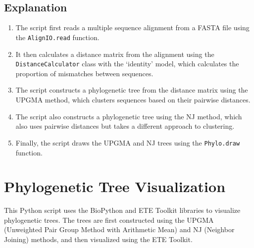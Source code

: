 \documentclass[11pt]{article}
\begin{document}
    \begin{center}
    \end{center}
    { \hspace*{\fill} \\}
    
    \begin{center}
    \end{center}
    { \hspace*{\fill} \\}
    
    \subsection{Explanation}\label{explanation}

\begin{enumerate}
\def\labelenumi{\arabic{enumi}.}
\item
  The script first reads a multiple sequence alignment from a FASTA file
  using the \texttt{AlignIO.read} function.
\item
  It then calculates a distance matrix from the alignment using the
  \texttt{DistanceCalculator} class with the `identity' model, which
  calculates the proportion of mismatches between sequences.
\item
  The script constructs a phylogenetic tree from the distance matrix
  using the UPGMA method, which clusters sequences based on their
  pairwise distances.
\item
  The script also constructs a phylogenetic tree using the NJ method,
  which also uses pairwise distances but takes a different approach to
  clustering.
\item
  Finally, the script draws the UPGMA and NJ trees using the
  \texttt{Phylo.draw} function.
\end{enumerate}

    \section{Phylogenetic Tree
Visualization}\label{phylogenetic-tree-visualization}

This Python script uses the BioPython and ETE Toolkit libraries to
visualize phylogenetic trees. The trees are first constructed using the
UPGMA (Unweighted Pair Group Method with Arithmetic Mean) and NJ
(Neighbor Joining) methods, and then visualized using the ETE Toolkit.
\end{document}
